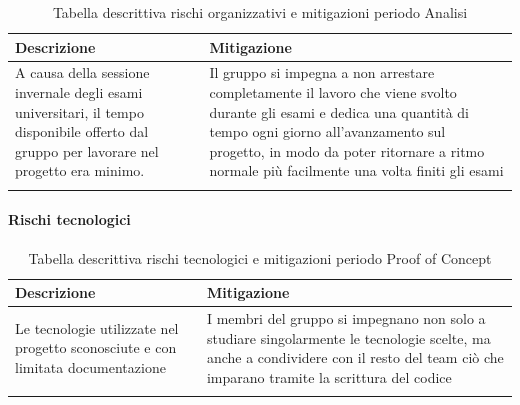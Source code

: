 \begin{center}


    \begin{xltabular}{\textwidth}{| X | X |}
                
        \textbf{\color{white} Descrizione} & \textbf{\color{white} Mitigazione}\\ 
        \endhead
    
        A causa della sessione invernale degli esami universitari, il tempo disponibile offerto dal gruppo per lavorare nel progetto era minimo. &
        Il gruppo si impegna a non arrestare completamente il lavoro che viene svolto durante gli esami e dedica una quantità di tempo ogni giorno
        all'avanzamento sul progetto, in modo da poter ritornare a ritmo normale più facilmente una volta finiti gli esami \\
        \hline
            
        \caption{Tabella descrittiva rischi organizzativi e mitigazioni periodo Analisi}\label{tab:rischi_organizzativi_poc}
    \end{xltabular}
\end{center}

\paragraph{Rischi tecnologici}

\begin{center}
    \begin{xltabular}{\textwidth}{| X | X |}
                
        \textbf{\color{white} Descrizione} & \textbf{\color{white} Mitigazione}\\ 
        \endhead
    
        Le tecnologie utilizzate nel progetto sconosciute e con limitata documentazione &
        I membri del gruppo si impegnano non solo a studiare singolarmente le tecnologie scelte, ma anche a condividere con il resto del team ciò che imparano
        tramite la scrittura del codice \\
        \hline
            
        \caption{Tabella descrittiva rischi tecnologici e mitigazioni periodo Proof of Concept}\label{tab:rischi_tecnologici_poc}
    \end{xltabular}
\end{center}

\newpage


